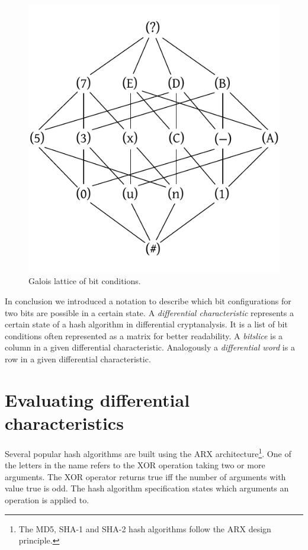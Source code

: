 \begin{figure}[p]
 \begin{center}
  \includegraphics{img/bit_condition_lattice.pdf}
  \caption{Galois lattice of bit conditions.}
  \label{fig:bitconditions-lattice}
 \end{center}
\end{figure}

In conclusion we introduced a notation to describe which bit configurations for two bits are possible in a certain state. A \emph{differential characteristic} represents a certain state of a hash algorithm in differential cryptanalysis. It is a list of bit conditions often represented as a matrix for better readability. A \emph{bitslice} is a column in a given differential characteristic. Analogously a \emph{differential word} is a row in a given differential characteristic.

\section{Evaluating differential characteristics}
\label{sec:diffchar-examples}
%
Several popular hash algorithms are built using the ARX architecture\footnote{The MD5, SHA-1 and SHA-2 hash algorithms follow the ARX design principle.}. One of the letters in the name refers to the XOR operation taking two or more arguments. The XOR operator returns true iff the number of arguments with value true is odd. The hash algorithm specification states which arguments an operation is applied to.


